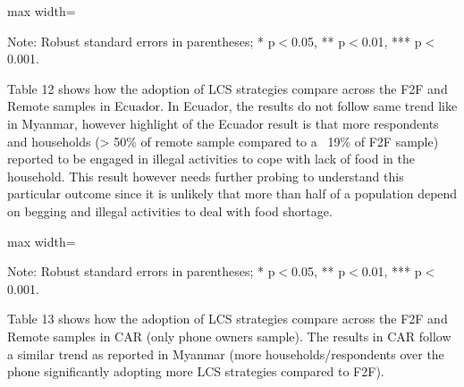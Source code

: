 \documentclass[11pt,harvard]{article}
\begin{document}
\begin{table}[htbp]
	\centering
	\begin{adjustbox}{max width=\textwidth}
		\begin{threeparttable}
			\caption{Myanmar: Each Coping Strategy Used}
			\scriptsize
			 
			\label{tab:LCS_Ind_Modality_Myanmar}
			\begin{tablenotes}
				\item Note: Robust standard errors in parentheses; * p$<$0.05, ** p$<$0.01, *** p$<$0.001. 
			\end{tablenotes}
		\end{threeparttable}
	\end{adjustbox}
\end{table}

Table 12 shows how the adoption of LCS strategies compare across the F2F and Remote samples in Ecuador. In Ecuador, the results do not follow same trend like in Myanmar, however highlight of the Ecuador result is that more respondents and households (> 50\% of remote sample compared to a ~19\% of F2F sample) reported to be engaged in illegal activities to cope with lack of food in the household. This result however needs further probing to understand this particular outcome since it is unlikely that more than half of a population depend on begging and illegal activities to deal with food shortage. 


\begin{table}[htbp]
	\centering
	\begin{adjustbox}{max width=\textwidth}
		\begin{threeparttable}
			\caption{Ecaudor: Each Coping Strategy Used}
			\scriptsize
			 
			\label{tab:LCS_Ind_Modality_Ecuador}
			\begin{tablenotes}
				\item Note: Robust standard errors in parentheses; * p$<$0.05, ** p$<$0.01, *** p$<$0.001. 
			\end{tablenotes}
		\end{threeparttable}
	\end{adjustbox}
\end{table}

Table 13 shows how the adoption of LCS strategies compare across the F2F and Remote samples in CAR (only phone owners sample). The results in CAR follow a similar trend as reported in Myanmar (more households/respondents over the phone significantly adopting more LCS strategies compared to F2F). 
\end{document}
